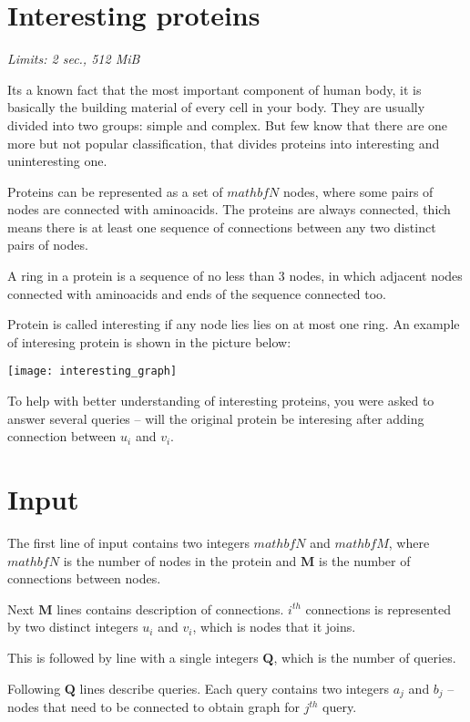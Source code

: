 \documentclass [11pt, a4paper, oneside, notitlepage] {article}
\begin{document}
\section*{Interesting proteins}
\hspace{1cm}
\emph{Limits: 2 sec., 512 MiB}
\bigskip

Its a known fact that the most important component of human body, it is basically the building material of every cell in your body. They are usually divided into two groups: simple and complex. But few know that there are one more but not popular classification, that divides proteins into interesting and uninteresting one.

Proteins can be represented as a set of $mathbf{N}$ nodes, where some pairs of nodes are connected with aminoacids. The proteins are always connected, thich means there is at least one sequence of connections between any two distinct pairs of nodes.

A ring in a protein is a sequence of no less than 3 nodes, in which adjacent nodes connected with aminoacids and ends of the sequence connected too.

Protein is called interesting if any node lies lies on at most one ring. An example of interesing protein is shown in the picture below:

\texttt{[image: interesting\_graph]}

To help with better understanding of interesting proteins, you were asked to answer several queries -- will the original protein be interesing after adding connection between $u_i$ and $v_i$.

\section*{Input}

The first line of input contains two integers $mathbf{N}$ and $mathbf{M}$, where $mathbf{N}$ is the number of nodes in the protein and $\mathbf{M}$ is the number of connections between nodes.

Next $\mathbf{M}$ lines contains description of connections. $i^{th}$ connections is represented by two distinct integers $u_i$ and $v_i$, which is nodes that it joins.

This is followed by line with a single integers $\mathbf{Q}$, which is the number of queries.

Following $\mathbf{Q}$ lines describe queries. Each query contains two integers $a_j$ and $b_j$ -- nodes that need to be connected to obtain graph for $j^{th}$ query.
\end{document}
